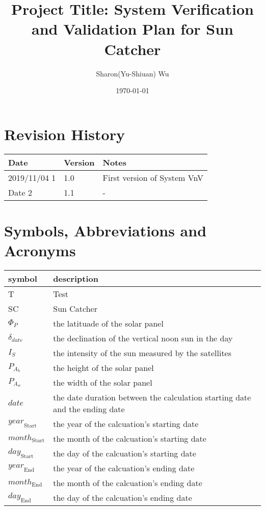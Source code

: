 \documentclass[12pt, titlepage]{article}
\begin{document}
\title{Project Title: System Verification and Validation Plan for Sun Catcher}

\author{Sharon(Yu-Shiuan) Wu} \date{\today} \maketitle
{}

\section{Revision History}

\begin{tabularx}{\textwidth}{p{3cm}p{2cm}X}
\toprule {\bf Date} & {\bf Version} & {\bf Notes}\\ 
\midrule 
2019/11/04 1 & 1.0 & First version of System VnV\\ 
Date 2 & 1.1 & -\\ 
\bottomrule 
\end{tabularx} \newpage
\tableofcontents

\listoftables

\listoffigures

\newpage

\section{Symbols, Abbreviations and Acronyms}

\renewcommand{\arraystretch}{1.2}
\begin{tabular}{l l} \toprule \textbf{symbol} & \textbf{description}\\
 \midrule T & Test\\ 
SC & Sun Catcher\\ 
$\Phi_P$ & the latituade of the solar panel \\ 
$\delta_{date}$ & the declination of the vertical noon sun in the day \\
$I_{S}$ &  the intensity of the sun measured by the satellites \\ 
$P_{A_{h}}$ & the height of the solar panel \\ 
$P_{A_{w}}$ & the width of the solar panel \\ 
$date$ & the date duration between the calculation starting date and the ending
date \\
$\mathit{year}_\text{Start}$ & the year of the calcuation's starting date\\ 
$\mathit{month}_\text{Start}$ & the month of the calcuation's starting date\\ 
$\mathit{day}_\text{Start}$ & the day of the calcuation's starting date\\ 
$\mathit{year}_\text{End}$ & the year of the calcuation's ending date\\ 
$\mathit{month}_\text{End}$ & the month of the calcuation's ending date\\ 
$\mathit{day}_\text{End}$ & the day of the calcuation's ending date\\ 
\bottomrule
\end{tabular}\\ 
\end{document}
